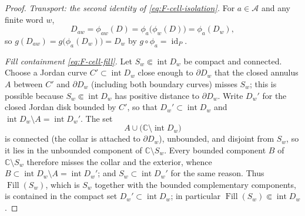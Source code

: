 \documentclass[11pt,reqno]{amsart}
\theoremstyle{definition}
\theoremstyle{remark}
\newcommand{\C}{\mathbb C}
\newcommand{\Fill}{\operatorname{Fill}}
\newcommand{\Int}{\operatorname{int}}
\newcommand{\id}{\operatorname{id}}
\begin{document}
\begin{proof}
\emph{Transport: the second identity of \eqref{eq:F-cell-isolation}.}
For $a\in\mathcal A$ and any finite word $w$,
\[
D_{aw}=\phi_{aw}(D)=\phi_a\bigl(\phi_w(D)\bigr)=\phi_a(D_w),
\]
so $g(D_{aw})=g\bigl(\phi_a(D_w)\bigr)=D_w$ by $g\circ\phi_a=\id_P$.

\emph{Fill containment \eqref{eq:F-cell-fill}.}
Let $S_w\Subset\Int D_w$ be compact and connected.  Choose a Jordan
curve $C'\subset\Int D_w$ close enough to $\partial D_w$ that the closed
annulus $A$ between $C'$ and $\partial D_w$ (including both boundary
curves) misses $S_w$; this is possible because $S_w\Subset\Int D_w$ has
positive distance to $\partial D_w$.  Write $D_w'$ for the closed Jordan
disk bounded by $C'$, so that $D_w'\subset\Int D_w$ and
$\Int D_w\setminus A=\Int D_w'$.  The set
\[
A\cup\bigl(\C\setminus\Int D_w\bigr)
\]
is connected (the collar is attached to $\partial D_w$), unbounded, and
disjoint from $S_w$, so it lies in the unbounded component of
$\C\setminus S_w$.  Every bounded component $B$ of $\C\setminus S_w$
therefore misses the collar and the exterior, whence
$B\subset\Int D_w\setminus A=\Int D_w'$; and $S_w\subset\Int D_w'$ for
the same reason.  Thus $\Fill(S_w)$, which is $S_w$ together with the
bounded complementary components, is contained in the compact set
$D_w'\subset\Int D_w$; in particular $\Fill(S_w)\Subset\Int D_w$.
\end{proof}
\end{document}
